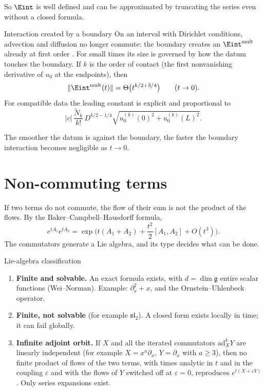 So $\Eint$ is well defined and can be approximated by truncating the series even without a closed formula.

\begin{proposition}{Interaction created by a boundary  \proved}\label{prop:boundary}
On an interval with Dirichlet conditions, advection and diffusion no longer commute: the boundary creates an $\Eint^{\mathrm{mult}}$ already at first order . For small times its size is governed by how the datum touches the boundary. If $k$ is the order of contact (the first nonvanishing derivative of $u_0$ at the endpoints), then
\[
\|\Eint^{\mathrm{mult}}(t)\|=\Theta\big(t^{k/2+3/4}\big)\qquad(t\to0).
\]
For compatible data the leading constant is explicit and proportional to
\[
|c|\,\frac{\tilde N_k}{k!}\,D^{k/2-1/4}\sqrt{u_0^{(k)}(0)^2+u_0^{(k)}(L)^2}.
\]
\end{proposition}

The smoother the datum is against the boundary, the faster the boundary interaction becomes negligible as $t\to0$.

\section{Non-commuting terms}\label{sec:noncomm}

If two terms do not commute, the flow of their sum is not the product of the flows. By the Baker--Campbell--Hausdorff formula,
\[
e^{tA_1}e^{tA_2}=\exp\Big(t(A_1+A_2)+\frac{t^2}{2}[A_1,A_2]+O(t^3)\Big).
\]
The commutators generate a Lie algebra, and its type decides what can be done.

\begin{theorem}{Lie-algebra classification  \proved}\label{thm:lie}
\begin{enumerate}[label=(\alph*)]
\item \textbf{Finite and solvable.} An exact formula exists, with $d=\dim\mathfrak g$ entire scalar functions (Wei--Norman). Example: $\partial_x^2+x$, and the Ornstein--Uhlenbeck operator.
\item \textbf{Finite, not solvable} (for example $\mathfrak{sl}_2$). A closed form exists locally in time; it can fail globally.
\item \textbf{Infinite adjoint orbit.} If $X$ and all the iterated commutators $\mathrm{ad}_X^kY$ are linearly independent (for example $X=x^a\partial_x$, $Y=\partial_x$ with $a\ge3$), then no finite product of flows of the two terms, with times analytic in $t$ and in the coupling $\varepsilon$ and with the flows of $Y$ switched off at $\varepsilon=0$, reproduces $e^{t(X+\varepsilon Y)}$. Only series expansions exist.
\end{enumerate}
\end{theorem}

